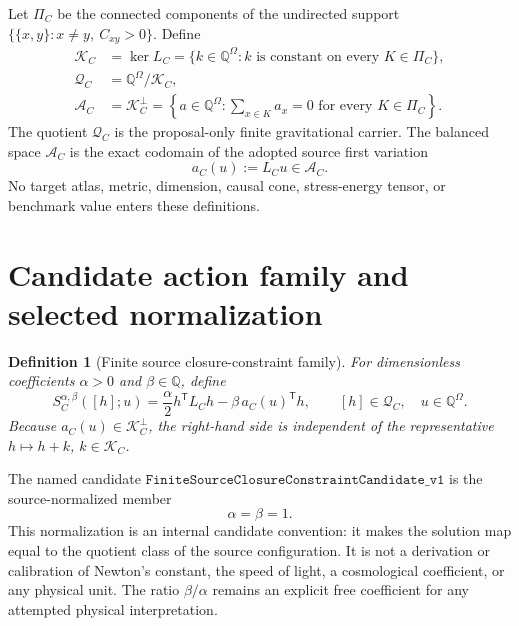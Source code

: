 \documentclass[11pt]{article}
\newtheorem{definition}{Definition}
\newcommand{\Q}{\mathbb Q}
\newcommand{\Aspace}{\mathcal A_C}
\newcommand{\Qspace}{\mathcal Q_C}
\newcommand{\Kspace}{\mathcal K_C}
\newcommand{\Sclosure}{S_C}
\begin{document}
Let \(\Pi_C\) be the connected components of the undirected support
\(\{\{x,y\}:x\ne y,\ C_{xy}>0\}\).  Define
\begin{align}
 \Kspace
   &=\ker L_C
     =\{k\in\Q^\Omega:k\text{ is constant on every }K\in\Pi_C\},\\
 \Qspace
   &=\Q^\Omega/\Kspace,\\
 \Aspace
   &=\Kspace^\perp
     =\left\{a\in\Q^\Omega:
       \sum_{x\in K}a_x=0\text{ for every }K\in\Pi_C\right\}.
 \label{eq:spaces}
\end{align}
The quotient \(\Qspace\) is the proposal-only finite gravitational carrier.
The balanced space \(\Aspace\) is the exact codomain of the adopted
source first variation
\[
  a_C(u):=L_Cu\in\Aspace.
\]
No target atlas, metric, dimension, causal cone, stress-energy tensor, or
benchmark value enters these definitions.

\section{Candidate action family and selected normalization}

\begin{definition}[Finite source closure-constraint family]
For dimensionless coefficients \(\alpha>0\) and \(\beta\in\Q\), define
\begin{equation}
 \Sclosure^{\alpha,\beta}([h];u)
 =\frac{\alpha}{2}h^{\mathsf T}L_Ch
  -\beta\,a_C(u)^{\mathsf T}h,
 \qquad [h]\in\Qspace,\quad u\in\Q^\Omega.
 \label{eq:action}
\end{equation}
Because \(a_C(u)\in\Kspace^\perp\), the right-hand side is independent of
the representative \(h\mapsto h+k\), \(k\in\Kspace\).
\end{definition}

The named candidate
\(\texttt{FiniteSourceClosureConstraintCandidate\_v1}\) is the
source-normalized member
\[
  \alpha=\beta=1.
\]
This normalization is an internal candidate convention: it makes the
solution map equal to the quotient class of the source configuration.  It
is not a derivation or calibration of Newton's constant, the speed of
light, a cosmological coefficient, or any physical unit.  The ratio
\(\beta/\alpha\) remains an explicit free coefficient for any attempted
physical interpretation.
\end{document}
